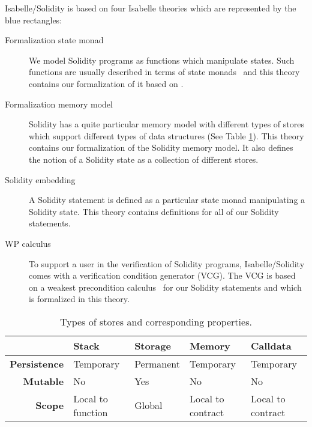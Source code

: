 \documentclass[a4paper,UKenglish,cleveref, autoref, thm-restate]{oasics-v2021}
\begin{document}
Isabelle/Solidity is based on four Isabelle theories which are represented by the {\color{blue}blue rectangles}:
\begin{description}
    \item[Formalization state monad]
    We model Solidity programs as functions which manipulate states.
    Such functions are usually described in terms of state monads~\cite{Wadler1993} and this theory contains our formalization of it based on \cite{Cock2008}.
    \item[Formalization memory model]
    Solidity has a quite particular memory model with different types of stores which support different types of data structures (See Table \ref{tab:stores}).
    This theory contains our formalization of the Solidity memory model.
    It also defines the notion of a Solidity state as a collection of different stores.
    \item[Solidity embedding]
    A Solidity statement is defined as a particular state monad manipulating a Solidity state.
    This theory contains definitions for all of our Solidity statements.
    \item[WP calculus]
    To support a user in the verification of Solidity programs, Isabelle/Solidity comes with a verification condition generator (VCG).
    The VCG is based on a weakest precondition calculus~\cite{Dijkstra1975} for our Solidity statements and which is formalized in this theory.
\end{description}
\begin{table}[h]\footnotesize
	\centering
	\caption{Types of stores and corresponding properties.}\label{tab:stores}
	\small\vspace{-0.2cm}
  \begin{tabular}{rllll}
		\toprule
		&\textbf{Stack}&\textbf{Storage}&\textbf{Memory}&\textbf{Calldata}\\
		\midrule
		\textbf{Persistence}&Temporary&Permanent&Temporary&Temporary\\
		\textbf{Mutable}&No&Yes&No&No\\
		\textbf{Scope}&Local to function&Global&Local to contract& Local to contract\\
		\bottomrule
	\end{tabular}
	\vspace{-0.5cm}
\end{table}
\end{document}
